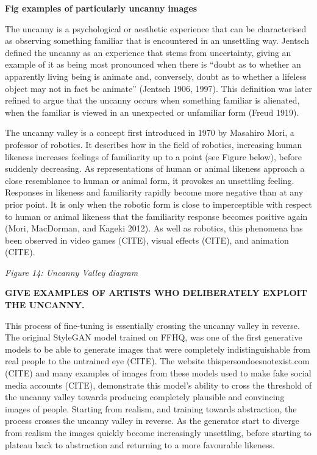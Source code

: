 \textbf{Fig examples of particularly uncanny images}

The uncanny is a psychological or aesthetic experience that can be characterised as observing something familiar that is encountered in an unsettling way. 
Jentsch defined the uncanny as an experience that stems from uncertainty, giving an example of it as being most pronounced when there is “doubt as to whether an apparently living being is animate and, conversely, doubt as to whether a lifeless object may not in fact be animate” (Jentsch 1906, 1997). 
This definition was later refined to argue that the uncanny occurs when something familiar is alienated, when the familiar is viewed in an unexpected or unfamiliar form (Freud 1919).

The uncanny valley is a concept first introduced in 1970 by Masahiro Mori, a professor of robotics. 
It describes how in the field of robotics, increasing human likeness increases feelings of familiarity up to a point (see Figure below), before suddenly decreasing. 
As representations of human or animal likeness approach a close resemblance to human or animal form, it provokes an unsettling feeling. 
Responses in likeness and familiarity rapidly become more negative than at any prior point. 
It is only when the robotic form is close to imperceptible with respect to human or animal likeness that the familiarity response becomes positive again (Mori, MacDorman, and Kageki 2012). 
As well as robotics, this phenomena has been observed in video games (CITE), visual effects (CITE), and animation (CITE). 

\textit{Figure 14: Uncanny Valley diagram}

\textbf{GIVE EXAMPLES OF ARTISTS WHO DELIBERATELY EXPLOIT THE UNCANNY.}

This process of fine-tuning is essentially crossing the uncanny valley in reverse.
The original StyleGAN model trained on FFHQ, was one of the first generative models to be able to generate images that were completely indistinguishable from real people to the untrained eye (CITE). 
The website thispersondoesnotexist.com (CITE) and many examples of images from these models used to make fake social media accounts (CITE), demonstrate this model's ability to cross the threshold of the uncanny valley towards producing completely plausible and convincing images of people.
Starting from realism, and training towards abstraction, the process crosses the uncanny valley in reverse. 
As the generator start to diverge from realism the images quickly become increasingly unsettling, before starting to plateau back to abstraction and returning to a more favourable likeness.

